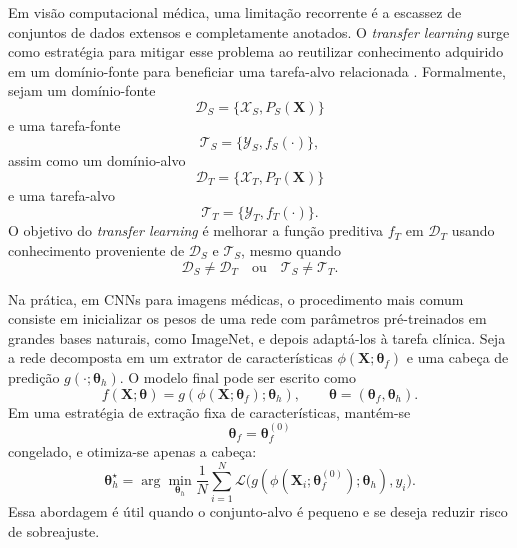 \documentclass[tcc,capa]{texufpel}
\begin{document}
Em visão computacional médica, uma limitação recorrente é a escassez de conjuntos de dados extensos e completamente anotados. O \textit{transfer learning} surge como estratégia para mitigar esse problema ao reutilizar conhecimento adquirido em um domínio-fonte para beneficiar uma tarefa-alvo relacionada \cite{Pan2010}. Formalmente, sejam um domínio-fonte
\begin{equation}
\mathcal{D}_S = \{\mathcal{X}_S, P_S(\mathbf{X})\}
\end{equation}
e uma tarefa-fonte
\begin{equation}
\mathcal{T}_S = \{\mathcal{Y}_S, f_S(\cdot)\},
\end{equation}
assim como um domínio-alvo
\begin{equation}
\mathcal{D}_T = \{\mathcal{X}_T, P_T(\mathbf{X})\}
\end{equation}
e uma tarefa-alvo
\begin{equation}
\mathcal{T}_T = \{\mathcal{Y}_T, f_T(\cdot)\}.
\end{equation}
O objetivo do \textit{transfer learning} é melhorar a função preditiva $f_T$ em $\mathcal{D}_T$ usando conhecimento proveniente de $\mathcal{D}_S$ e $\mathcal{T}_S$, mesmo quando
\begin{equation}
\mathcal{D}_S \neq \mathcal{D}_T
\quad \text{ou} \quad
\mathcal{T}_S \neq \mathcal{T}_T.
\end{equation}

Na prática, em CNNs para imagens médicas, o procedimento mais comum consiste em inicializar os pesos de uma rede com parâmetros pré-treinados em grandes bases naturais, como ImageNet, e depois adaptá-los à tarefa clínica. Seja a rede decomposta em um extrator de características $\phi(\mathbf{X};\boldsymbol{\theta}_f)$ e uma cabeça de predição $g(\cdot;\boldsymbol{\theta}_h)$. O modelo final pode ser escrito como
\begin{equation}
f(\mathbf{X};\boldsymbol{\theta}) = g(\phi(\mathbf{X};\boldsymbol{\theta}_f);\boldsymbol{\theta}_h),
\qquad
\boldsymbol{\theta} = (\boldsymbol{\theta}_f,\boldsymbol{\theta}_h).
\end{equation}
Em uma estratégia de extração fixa de características, mantém-se
\begin{equation}
\boldsymbol{\theta}_f = \boldsymbol{\theta}_f^{(0)}
\end{equation}
congelado, e otimiza-se apenas a cabeça:
\begin{equation}
\boldsymbol{\theta}_h^{\star}
=
\arg\min_{\boldsymbol{\theta}_h}
\frac{1}{N}\sum_{i=1}^{N}
\mathcal{L}\big(g(\phi(\mathbf{X}_i;\boldsymbol{\theta}_f^{(0)});\boldsymbol{\theta}_h), y_i\big).
\end{equation}
Essa abordagem é útil quando o conjunto-alvo é pequeno e se deseja reduzir risco de sobreajuste.
\end{document}
